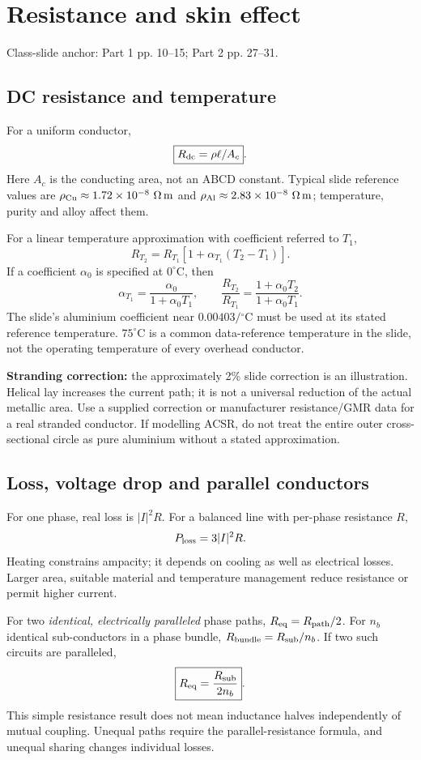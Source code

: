 \documentclass[11pt,a4paper]{article}
\newcommand{\slides}[1]{{\small\color{muted}\textsf{Class-slide anchor: #1.}}\par}
\newcommand{\chapterstart}[2]{\clearpage\section{#1}\label{#2}}
\newcommand{\ans}[1]{\boxed{#1}}
\begin{document}
\chapterstart{Resistance and skin effect}{resistance}
\slides{Part 1 pp. 10--15; Part 2 pp. 27--31}
\subsection{DC resistance and temperature}
For a uniform conductor,
\[
 \ans{R_{\rm dc}=\rho\ell/A_c}.
\]
Here $A_c$ is the conducting area, not an ABCD constant. Typical slide reference values are $\rho_{\rm Cu}\approx1.72\times10^{-8}\ \Omega\,\mathrm m$ and $\rho_{\rm Al}\approx2.83\times10^{-8}\ \Omega\,\mathrm m$; temperature, purity and alloy affect them.

For a linear temperature approximation with coefficient referred to $T_1$,
\[
 R_{T_2}=R_{T_1}[1+\alpha_{T_1}(T_2-T_1)].
\]
If a coefficient $\alpha_0$ is specified at $0^\circ$C, then
\[
 \alpha_{T_1}=\frac{\alpha_0}{1+\alpha_0T_1},\qquad
 \frac{R_{T_2}}{R_{T_1}}=\frac{1+\alpha_0T_2}{1+\alpha_0T_1}.
\]
The slide's aluminium coefficient near $0.00403/{}^\circ$C must be used at its stated reference temperature. $75^\circ$C is a common data-reference temperature in the slide, not the operating temperature of every overhead conductor.

\textbf{Stranding correction:} the approximately 2\% slide correction is an illustration. Helical lay increases the current path; it is not a universal reduction of the actual metallic area. Use a supplied correction or manufacturer resistance/GMR data for a real stranded conductor. If modelling ACSR, do not treat the entire outer cross-sectional circle as pure aluminium without a stated approximation.
\subsection{Loss, voltage drop and parallel conductors}
For one phase, real loss is $|I|^2R$. For a balanced line with per-phase resistance $R$,
\[
 P_{\rm loss}=3|I|^2R.
\]
Heating constrains ampacity; it depends on cooling as well as electrical losses. Larger area, suitable material and temperature management reduce resistance or permit higher current.

For two \emph{identical, electrically paralleled} phase paths, $R_{\rm eq}=R_{\rm path}/2$. For $n_b$ identical sub-conductors in a phase bundle, $R_{\rm bundle}=R_{\rm sub}/n_b$. If two such circuits are paralleled,
\[
 \ans{R_{\rm eq}=\frac{R_{\rm sub}}{2n_b}}.
\]
This simple resistance result does not mean inductance halves independently of mutual coupling. Unequal paths require the parallel-resistance formula, and unequal sharing changes individual losses.
\end{document}
